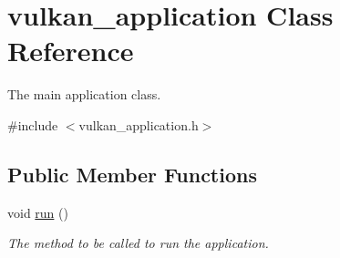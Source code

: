 \hypertarget{classvulkan__application}{}\section{vulkan\+\_\+application Class Reference}
\label{classvulkan__application}


The main application class.  




{\ttfamily \#include $<$vulkan\+\_\+application.\+h$>$}

\subsection*{Public Member Functions}
\begin{DoxyCompactItemize}
\item 
void \mbox{\hyperlink{classvulkan__application_a3f7182376c00ba7af1faa6a04bf2fb47}{run}} ()
\begin{DoxyCompactList}\small\item\em The method to be called to run the application. \end{DoxyCompactList}\end{DoxyCompactItemize}
